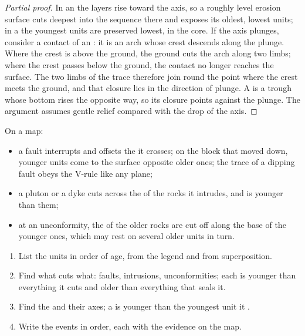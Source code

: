 \begin{proof}[Partial proof]
In an  the layers rise toward the axis, so a roughly level erosion
surface cuts deepest into the sequence there and exposes its oldest, lowest
units; in a  the youngest units are preserved lowest, in the core. If
the axis plunges, consider a contact of an : it is an arch whose
crest descends along the plunge. Where the crest is above the ground, the
ground cuts the arch along two limbs; where the crest passes below the
ground, the contact no longer reaches the surface. The two limbs of the trace
therefore join round the point where the crest meets the ground, and that
closure lies in the direction of plunge. A  is a trough whose bottom
rises the opposite way, so its closure points against the plunge. The
argument assumes gentle relief compared with the drop of the axis.
\end{proof}

\begin{proposition}\label{prop:b1:geological-maps:cuts}
On a map:
\begin{itemize}
  \item a fault interrupts and offsets the  it crosses; on the block
        that moved down, younger units come to the surface opposite older
        ones; the trace of a dipping fault obeys the V-rule like any plane;
  \item a pluton or a dyke cuts across the  of the rocks it intrudes,
        and is younger than them;
  \item at an unconformity, the  of the older rocks are cut off
        along the base of the younger ones, which may rest on several older
        units in turn.
\end{itemize}
\end{proposition}

\begin{method}\label{met:b1:geological-maps:history}
\begin{enumerate}
  \item List the units in order of age, from the legend and from
        superposition.
  \item Find what cuts what: faults, intrusions, unconformities; each is
        younger than everything it cuts and older than everything that seals
        it.
  \item Find the  and their axes; a  is younger than the youngest
        unit it .
  \item Write the events in order, each with the evidence on the map.
\end{enumerate}
\end{method}

